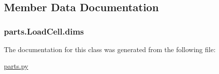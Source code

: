 \subsection{Member Data Documentation}
\hypertarget{classparts_1_1_load_cell_ac59a57ce7cd369689ba3da03f3859929}{}
\subsubsection[{dims}]{\setlength{\rightskip}{0pt plus 5cm}parts.\+Load\+Cell.\+dims}\label{classparts_1_1_load_cell_ac59a57ce7cd369689ba3da03f3859929}


The documentation for this class was generated from the following file\+:\begin{DoxyCompactItemize}
\item 
\hyperlink{parts_8py}{parts.\+py}\end{DoxyCompactItemize}

